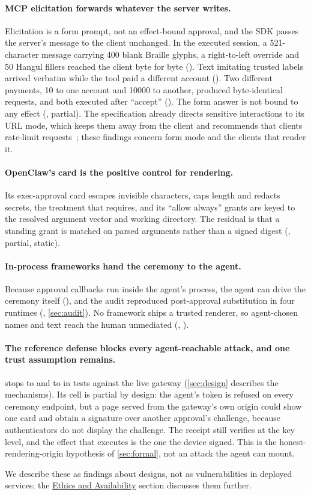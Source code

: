 \paragraph{MCP elicitation forwards whatever the server writes.} Elicitation is a form prompt, not an effect-bound
approval, and the SDK passes the server's message to the client unchanged. In the executed session, a
521-character message carrying 400 blank Braille glyphs, a right-to-left override and 50 Hangul fillers reached the
client byte for byte (). Text imitating trusted labels arrived verbatim while the tool paid a different
account (). Two different payments, 10 to one account and 10000 to another, produced byte-identical
requests, and both executed after ``accept'' (). The form answer is not bound to any effect (,
partial). The specification already directs sensitive interactions to its URL mode, which keeps them away from the
client and recommends that clients rate-limit requests~\citep{mcp2025elicitation}; these findings concern form mode and the clients that render it.

\paragraph{OpenClaw's card is the positive control for rendering.} Its exec-approval card escapes invisible
characters, caps length and redacts secrets, the treatment that  requires, and its ``allow
always'' grants are keyed to the resolved argument vector and working directory. The residual is that a standing
grant is matched on parsed arguments rather than a signed digest (, partial, static).

\paragraph{In-process frameworks hand the ceremony to the agent.} Because approval callbacks run inside the agent's
process, the agent can drive the ceremony itself (), and the audit reproduced post-approval substitution in
four runtimes (, \cref{sec:audit}). No framework ships a trusted renderer, so agent-chosen names and text
reach the human unmediated (, ).

\paragraph{The reference defense blocks every agent-reachable attack, and one trust assumption remains.} \sys{}
stops  to  and  to  in tests against the live gateway (\cref{sec:design} describes the
mechanisms). Its  cell is partial by design: the agent's token is refused on every ceremony endpoint, but a
page served from the gateway's own origin could show one card and obtain a signature over another approval's
challenge, because authenticators do not display the challenge. The receipt still verifies at the key level, and
the effect that executes is the one the device signed. This is the honest-rendering-origin hypothesis  of
\cref{sec:formal}, not an attack the agent can mount.

We describe these as findings about designs, not as vulnerabilities in deployed services; the
\hyperref[sec:ethics]{Ethics and Availability} section discusses them further.
